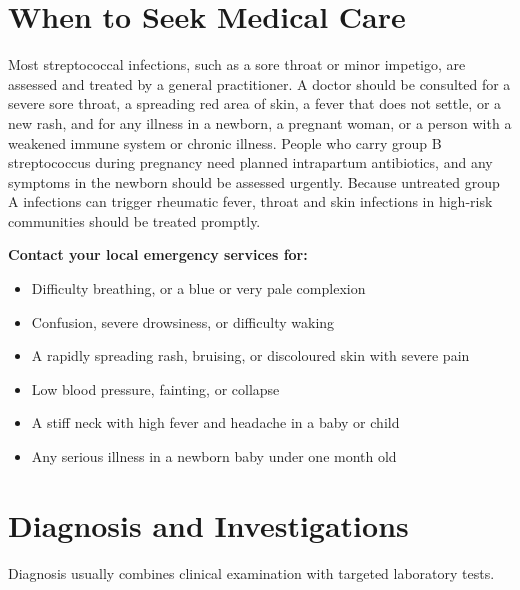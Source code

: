 \section*{When to Seek Medical Care}
Most streptococcal infections, such as a sore throat or minor impetigo, are assessed and treated by a general practitioner. A doctor should be consulted for a severe sore throat, a spreading red area of skin, a fever that does not settle, or a new rash, and for any illness in a newborn, a pregnant woman, or a person with a weakened immune system or chronic illness. People who carry group B streptococcus during pregnancy need planned intrapartum antibiotics, and any symptoms in the newborn should be assessed urgently. Because untreated group A infections can trigger rheumatic fever, throat and skin infections in high-risk communities should be treated promptly.

\textbf{Contact your local emergency services for:}
\begin{itemize}
    \item Difficulty breathing, or a blue or very pale complexion
    \item Confusion, severe drowsiness, or difficulty waking
    \item A rapidly spreading rash, bruising, or discoloured skin with severe pain
    \item Low blood pressure, fainting, or collapse
    \item A stiff neck with high fever and headache in a baby or child
    \item Any serious illness in a newborn baby under one month old
\end{itemize}

\section*{Diagnosis and Investigations}
Diagnosis usually combines clinical examination with targeted laboratory tests.

